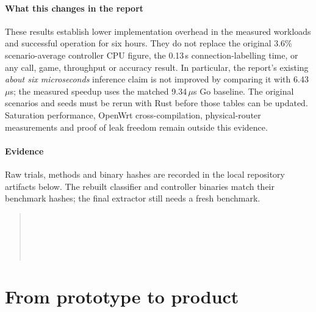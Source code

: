 \documentclass[11pt,a4paper]{article}
\begin{document}
\paragraph{What this changes in the report} These results establish lower implementation overhead in the measured workloads and successful operation for six hours. They do not replace the original 3.6\% scenario-average controller CPU figure, the 0.13\,s connection-labelling time, or any call, game, throughput or accuracy result. In particular, the report's existing \emph{about six microseconds} inference claim is not improved by comparing it with 6.43\,$\mu$s; the measured speedup uses the matched 9.34\,$\mu$s Go baseline. The original scenarios and seeds must be rerun with Rust before those tables can be updated. Saturation performance, OpenWrt cross-compilation, physical-router measurements and proof of leak freedom remain outside this evidence.

\paragraph{Evidence} Raw trials, methods and binary hashes are recorded in the local repository artifacts below. The rebuilt classifier and controller binaries match their benchmark hashes; the final extractor still needs a fresh benchmark.
\begin{quote}\small
{}\\
\\
\\
\\
\end{quote}

\section{From prototype to product}\label{sec:product}
\end{document}
